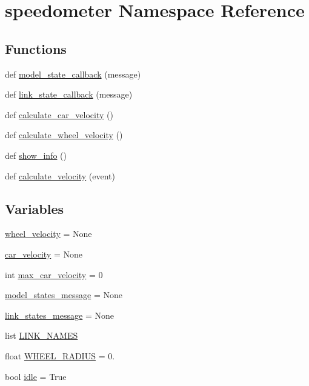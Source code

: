 \hypertarget{namespacespeedometer}{}\section{speedometer Namespace Reference}
\label{namespacespeedometer}
\subsection*{Functions}
\begin{DoxyCompactItemize}
\item 
def \hyperlink{namespacespeedometer_a06ac7e0dff56627c3e41df35a34be250}{model\+\_\+state\+\_\+callback} (message)
\item 
def \hyperlink{namespacespeedometer_aaa7b932d9d450076f71c23081bfd29ec}{link\+\_\+state\+\_\+callback} (message)
\item 
def \hyperlink{namespacespeedometer_a4ca81a50632f9d3d0e04894fca34e332}{calculate\+\_\+car\+\_\+velocity} ()
\item 
def \hyperlink{namespacespeedometer_a2a7f450594d6757472719121830bb6a6}{calculate\+\_\+wheel\+\_\+velocity} ()
\item 
def \hyperlink{namespacespeedometer_a7967d975c1e5c437230824172a16192c}{show\+\_\+info} ()
\item 
def \hyperlink{namespacespeedometer_afed491810c85b27bb72e83868d0dc71a}{calculate\+\_\+velocity} (event)
\end{DoxyCompactItemize}
\subsection*{Variables}
\begin{DoxyCompactItemize}
\item 
\hyperlink{namespacespeedometer_a4f329df61648541a047c1ceb436db5cb}{wheel\+\_\+velocity} = None
\item 
\hyperlink{namespacespeedometer_ae3da3978da28ccc499609198cdfcc8ac}{car\+\_\+velocity} = None
\item 
int \hyperlink{namespacespeedometer_a11f245c5d45ac2b534d8d0b46e877dfc}{max\+\_\+car\+\_\+velocity} = 0
\item 
\hyperlink{namespacespeedometer_add00b4d69fb6713b1aca36de3240e3b2}{model\+\_\+states\+\_\+message} = None
\item 
\hyperlink{namespacespeedometer_a030c5ef20479fe5a9bdc7018cefc3d88}{link\+\_\+states\+\_\+message} = None
\item 
list \hyperlink{namespacespeedometer_ade01e300777f9944bd7c39c26cf8552e}{L\+I\+N\+K\+\_\+\+N\+A\+M\+ES}
\item 
float \hyperlink{namespacespeedometer_a5ec2676909937c0711ae29e3b7dfe8ba}{W\+H\+E\+E\+L\+\_\+\+R\+A\+D\+I\+US} = 0.
\item 
bool \hyperlink{namespacespeedometer_a0c05a122cf47c59aac7039707167c54e}{idle} = True
\end{DoxyCompactItemize}


